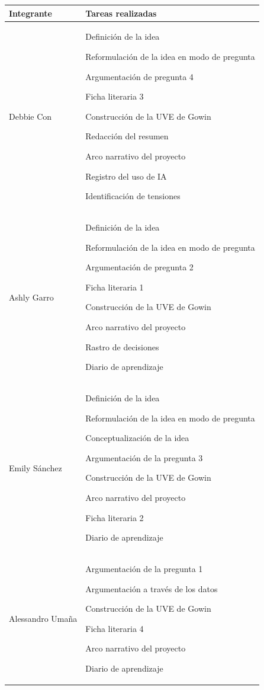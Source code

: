 \documentclass[12pt]{article}
\begin{document}
\begin{table}[h!]
\centering
\small
\begin{tabular}{|p{3cm}|p{8cm}|}
\hline
\textbf{Integrante} & \textbf{Tareas realizadas} \\ \hline

Debbie Con & 
Definición de la idea \par
Reformulación de la idea en modo de pregunta \par
Argumentación de pregunta 4 \par
Ficha literaria 3 \par
Construcción de la UVE de Gowin \par
Redacción del resumen \par
Arco narrativo del proyecto \par
Registro del uso de IA \par
Identificación de tensiones \\ \hline

Ashly Garro & 
Definición de la idea \par
Reformulación de la idea en modo de pregunta \par
Argumentación de pregunta 2 \par
Ficha literaria 1 \par
Construcción de la UVE de Gowin \par
Arco narrativo del proyecto \par
Rastro de decisiones \par
Diario de aprendizaje \\ \hline

Emily Sánchez &
Definición de la idea \par
Reformulación de la idea en modo de pregunta \par
Conceptualización de la idea \par
Argumentación de la pregunta 3 \par
Construcción de la UVE de Gowin \par
Arco narrativo del proyecto \par
Ficha literaria 2 \par
Diario de aprendizaje \\ \hline

Alessandro Umaña & 
Argumentación de la pregunta 1 \par
Argumentación a través de los datos \par
Construcción de la UVE de Gowin \par
Ficha literaria 4 \par
Arco narrativo del proyecto \par
Diario de aprendizaje \\ \hline

\end{tabular}
\end{table}
\end{document}
